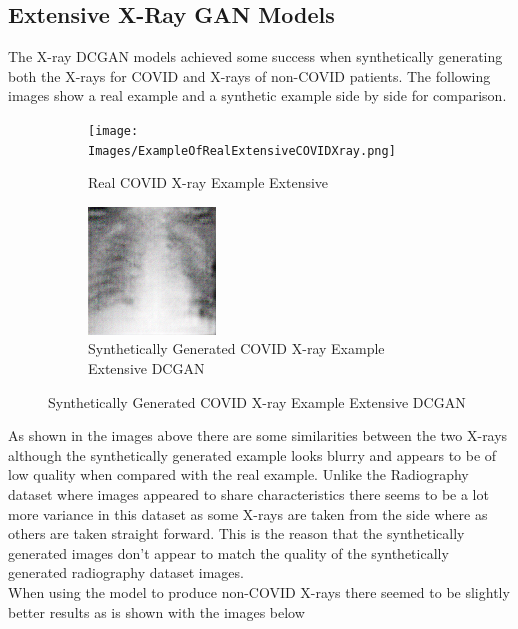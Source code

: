 \subsection{Extensive X-Ray GAN Models}
The X-ray DCGAN models achieved some success when synthetically generating both the X-rays for COVID and X-rays of non-COVID patients.  The following images show a real example and a synthetic example side by side for comparison.
 \begin{figure}[H]
    \centering
    \begin{subfigure}{.4\textwidth}
    \centering
      \texttt{[image: Images/ExampleOfRealExtensiveCOVIDXray.png]}
      \caption{Real COVID X-ray Example Extensive}
      \label{fig:Real COVID X-ray Example Extensive}
    \end{subfigure}\hfill%
    \begin{subfigure}{.4\textwidth}
    \centering
      \includegraphics[width=.4\linewidth,keepaspectratio]{Images/ExampleOfSyntheticallyGeneratedCOVIDXrayExtensiveDCGAN.png}
      \caption{Synthetically Generated COVID X-ray Example Extensive DCGAN}
      \label{fig:Synthetically Generated COVID X-ray Example Extensive DCGAN}
    \end{subfigure}\hfill%
\end{figure}
As shown in the images above there are some similarities between the two X-rays although the synthetically generated example looks blurry and appears to be of low quality when compared with the real example.  Unlike the Radiography dataset where images appeared to share characteristics there seems to be a lot more variance in this dataset as some X-rays are taken from the side where as others are taken straight forward.  This is the reason that the synthetically generated images don't appear to match the quality of the synthetically generated radiography dataset images.
\\
When using the model to produce non-COVID X-rays there seemed to be slightly better results as is shown with the images below
